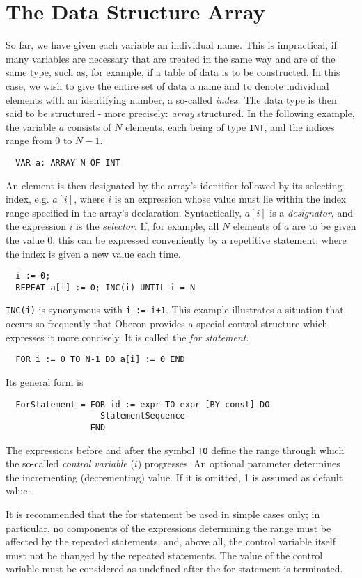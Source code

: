 \chapter{The Data Structure Array}
So far, we have given each variable an individual name. This is impractical, if many
variables are necessary that are treated in the same way and are of the same type, such as,
for example, if a table of data is to be constructed. In this case, we wish to give the
entire set of data a name and to denote individual elements with an identifying number,
a so-called \emph{index}. The data type is then said to be structured - more precisely:
\emph{array} structured. In the following example, the variable $a$ consists of $N$
elements, each being of type \verb|INT|, and the indices range from $0$ to $N-1$.
\begin{verbatim}
  VAR a: ARRAY N OF INT
\end{verbatim}
An element is then designated by the array's identifier followed by its selecting index,
e.g. $a[i]$, where $i$ is an expression whose value must lie within the index range
specified in the array's declaration. Syntactically, $a[i]$ is a \emph{designator}, and
the expression $i$ is the \emph{selector}. If, for example, all $N$ elements of $a$ are
to be given the value $0$, this can be expressed conveniently by a repetitive statement,
where the index is given a new value each time.
\begin{verbatim}
  i := 0;
  REPEAT a[i] := 0; INC(i) UNTIL i = N
\end{verbatim}
\verb|INC(i)| is synonymous with \verb|i := i+1|. This example illustrates a situation
that occurs so frequently that Oberon provides a special control structure which expresses
it more concisely.  It is called the \emph{for statement}.
\begin{verbatim}
  FOR i := 0 TO N-1 DO a[i] := 0 END
\end{verbatim}
Its general form is
\begin{verbatim}
  ForStatement = FOR id := expr TO expr [BY const] DO
                   StatementSequence
                 END
\end{verbatim}
The expressions before and after the symbol \verb|TO| define the range through which the
so-called \emph{control variable} ($i$) progresses. An optional parameter determines the
incrementing (decrementing) value. If it is omitted, 1 is assumed as default value.

It is recommended that the for statement be used in simple cases only; in particular, no
components of the expressions determining the range must be affected by the repeated
statements, and, above all, the control variable itself must not be changed by the repeated
statements. The value of the control variable must be considered as undefined after the
for statement is terminated.


